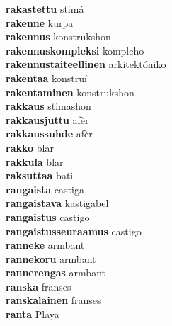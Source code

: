 \textbf{rakastettu } stimá \\
\textbf{rakenne } kurpa \\
\textbf{rakennus } konstrukshon \\
\textbf{rakennuskompleksi } kompleho \\
\textbf{rakennustaiteellinen } arkitektóniko \\
\textbf{rakentaa } konstruí \\
\textbf{rakentaminen } konstrukshon \\
\textbf{rakkaus } stimashon \\
\textbf{rakkausjuttu } afèr \\
\textbf{rakkaussuhde } afèr \\
\textbf{rakko } blar \\
\textbf{rakkula } blar \\
\textbf{raksuttaa } bati \\
\textbf{rangaista } castiga \\
\textbf{rangaistava } kastigabel \\
\textbf{rangaistus } castigo \\
\textbf{rangaistusseuraamus } castigo \\
\textbf{ranneke } armbant \\
\textbf{rannekoru } armbant \\
\textbf{rannerengas } armbant \\
\textbf{ranska } franses \\
\textbf{ranskalainen } franses \\
\textbf{ranta } Playa \\
